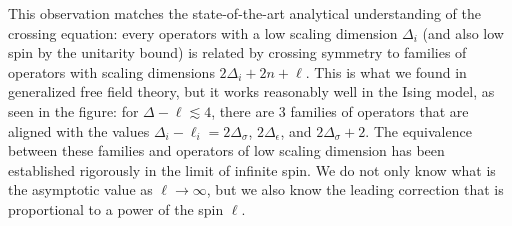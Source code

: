 \documentclass[a4paper,12pt]{article}
\numberwithin{equation}{section}
\begin{document}
This observation matches the state-of-the-art analytical understanding of the crossing equation: every operators with a low scaling dimension $\Delta_i$ (and also low spin by the unitarity bound) is related by crossing symmetry to families of operators with scaling dimensions $2\Delta_i + 2n + \ell$. This is what we found in generalized free field theory, but it works reasonably well in the Ising model, as seen in the figure: for $\Delta - \ell \lesssim 4$, there are 3 families of operators that are aligned with the values $\Delta_i - \ell_i = 2 \Delta_\sigma$, $2 \Delta_\epsilon$, and $2 \Delta_\sigma + 2$.
The equivalence between these families and operators of low scaling dimension has been established rigorously in the limit of infinite spin. We do not only know what is the asymptotic value as $\ell \to \infty$, but we also know the leading correction that is proportional to a power of the spin $\ell$.
\end{document}
